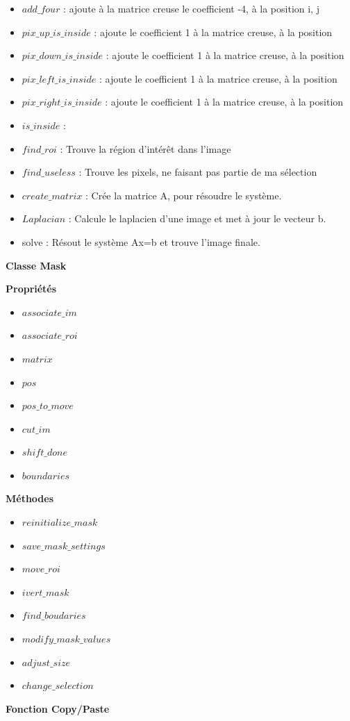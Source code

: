 \begin{itemize}
\item $add\_four$ : ajoute à la matrice creuse le coefficient -4, à la position i, j
\item $pix\_up\_is\_inside$ : ajoute le coefficient 1 à la matrice creuse, à la position
\item $pix\_down\_is\_inside$ : ajoute le coefficient 1 à la matrice creuse, à la position
\item $pix\_left\_is\_inside$ : ajoute le coefficient 1 à la matrice creuse, à la position
\item $pix\_right\_is\_inside$ : ajoute le coefficient 1 à la matrice creuse, à la position
\item $is\_inside$ : 
\item $find\_roi$ :  Trouve la région d'intérêt dans l'image
\item $find\_useless$ : Trouve les pixels, ne faisant pas partie de ma sélection
\item $create\_matrix$  : Crée la matrice A, pour résoudre le système.
\item $Laplacian$ :  Calcule le laplacien d'une image et met à jour le vecteur b.
\item solve :  Résout le système Ax=b et trouve l'image finale.
\end{itemize}

\begin{center}
\textbf{Classe Mask}\\
\end{center}
\textbf{Propriétés}\\
\begin{itemize}
\item $associate\_im$
\item $associate\_roi$
\item $matrix$
\item $pos$
\item $pos\_to\_move$
\item $cut\_im$
\item $shift\_done$
\item $boundaries$
\end{itemize}
\textbf{Méthodes}
\begin{itemize}
\item $reinitialize\_mask$
\item $save\_mask\_settings$
\item $move\_roi$
\item $ivert\_mask$
\item $find\_boudaries$
\item $modify\_mask\_values$
\item $adjust\_size$
\item $change\_selection$
\end{itemize}
\begin{center}
\textbf{Fonction Copy/Paste}
\end{center}